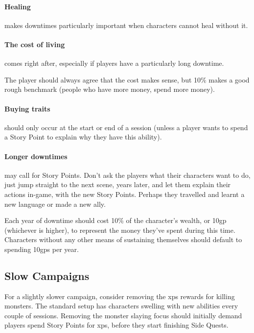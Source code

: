 \begin{multicols}{2}
\paragraph{Healing}
makes downtimes particularly important when characters cannot heal without it.

\paragraph{The cost of living}
comes right after, especially if players have a particularly long downtime.

The player should always agree that the cost makes sense, but 10\% makes a good rough benchmark (people who have more money, spend more money).

\paragraph{Buying traits}
should only occur at the start or end of a session (unless a player wants to spend a Story Point to explain why they have this ability).


\paragraph{Longer downtimes}
may call for Story Points.
Don't ask the players what their characters want to do, just jump straight to the next scene, years later, and let them explain their actions in-game, with the new Story Points.
Perhaps they travelled and learnt a new language or made a new ally.

Each year of downtime should cost 10\% of the character's wealth, or 10\gls{gp} (whichever is higher), to represent the money they've spent during this time.
Characters without any other means of sustaining themselves should default to spending 10\glspl{gp} per year.

\subsection{Slow Campaigns}

For a slightly slower campaign, consider removing the \glspl{xp} rewards for killing monsters.
The standard setup has characters swelling with new abilities every couple of sessions.
Removing the monster slaying focus should initially demand players spend Story Points for \glspl{xp}, before they start finishing Side Quests.

\end{multicols}

